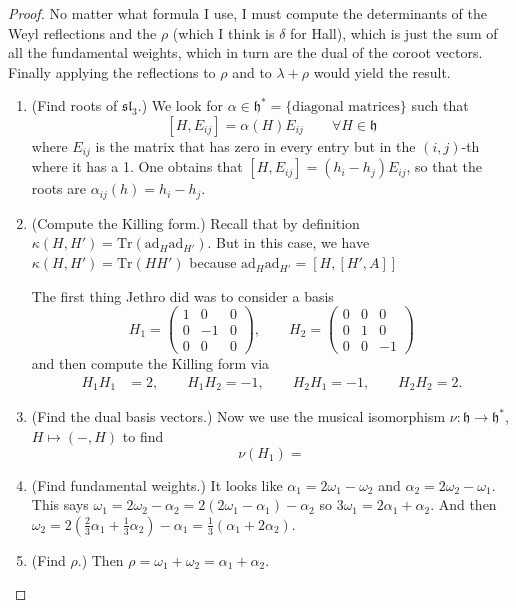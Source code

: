 \begin{proof}
No matter what formula I use, I must compute
the determinants of the Weyl reflections
and the $\rho$ (which I think is $\delta$ for Hall),
which is just the sum of all the fundamental weights,
which in turn are the dual of the coroot vectors.
Finally applying the reflections to $\rho$ and
to $\lambda+\rho$ would yield the result.
\begin{enumerate}
\item (Find roots of $\mathfrak{sl}_3$.) We look for $\alpha \in \mathfrak{h}^*
= \{\text{diagonal matrices}\}$ such that
$$
[H,E_{ij}]=\alpha(H)E_{ij}\qquad \forall H \in \mathfrak{h}
$$
where $E_{ij}$ is the matrix that has zero in every entry but 
in the $(i,j)$-th where it has a 1. One obtains that
$[H,E_{ij}]=(h_i-h_j)E_{ij}$, so that the roots are
$\alpha_{ij}(h)=h_i-h_j$. 

\item (Compute the Killing form.) Recall that by definition
$\kappa(H,H')=\text{Tr}(\text{ad}_H\text{ad}_{H'})$.
But in this case, we have $\kappa(H,H')=\text{Tr}(HH')$ 
because $\text{ad}_H\text{ad}_{H'}=[H,[H',A]]$

The first thing Jethro did was to consider a basis
$$
H_1=\begin{pmatrix}
1&0&0\\ 
0&-1&0\\
0&0&0
\end{pmatrix},
\qquad
H_2=\begin{pmatrix}
0&0&0\\ 
0&1&0\\
0&0&-1
\end{pmatrix}
$$
and then compute the Killing form via
\begin{align*}
H_1H_1&=2,\qquad H_1H_2=-1,\qquad H_2H_1=-1,\qquad H_2H_2=2.
\end{align*}

\item (Find the dual basis vectors.) Now we use the musical
isomorphism $\nu:\mathfrak{h}\to \mathfrak{h}^*$, 
$H\mapsto (-,H)$ to find
$$
\nu(H_1)=
$$
\item (Find fundamental weights.) It looks like $\alpha_1=2 \omega_1-\omega_2$
and $\alpha_2=2\omega_2-\omega_1$. This says 
$\omega_1=2\omega_2-\alpha_2=2(2\omega_1-\alpha_1)-\alpha_2$ so
$3\omega_1=2\alpha_1+\alpha_2$. And then 
$\omega_2=2(\frac{2}{3}\alpha_1+\frac{1}{3}\alpha_2)-\alpha_1
=\frac{1}{3}(\alpha_1+2\alpha_2)$.

\item (Find $\rho$.) Then $\rho=\omega_1+\omega_2=\alpha_1+\alpha_2$.


\end{enumerate}
\end{proof}
